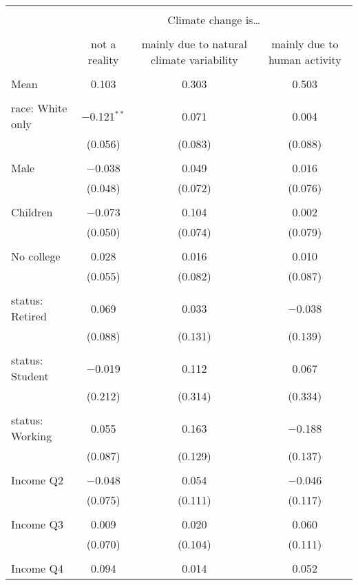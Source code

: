
\begin{tabular}{@{\extracolsep{5pt}}lccc} 
\\[-1.8ex]\hline 
\hline \\[-1.8ex] 
 & \multicolumn{3}{c}{Climate change is…} \\ 
\cline{2-4} 
\\[-1.8ex] & not a reality & mainly due to natural climate variability & mainly due to human activity \\ 
\hline \\[-1.8ex] 
 Mean & 0.103 & 0.303 & 0.503  \\ \hline \\[-1.8ex] race: White only & $-$0.121$^{**}$ & 0.071 & 0.004 \\ 
  & (0.056) & (0.083) & (0.088) \\ 
  & & & \\ 
 Male & $-$0.038 & 0.049 & 0.016 \\ 
  & (0.048) & (0.072) & (0.076) \\ 
  & & & \\ 
 Children & $-$0.073 & 0.104 & 0.002 \\ 
  & (0.050) & (0.074) & (0.079) \\ 
  & & & \\ 
 No college & 0.028 & 0.016 & 0.010 \\ 
  & (0.055) & (0.082) & (0.087) \\ 
  & & & \\ 
 status: Retired & 0.069 & 0.033 & $-$0.038 \\ 
  & (0.088) & (0.131) & (0.139) \\ 
  & & & \\ 
 status: Student & $-$0.019 & 0.112 & 0.067 \\ 
  & (0.212) & (0.314) & (0.334) \\ 
  & & & \\ 
 status: Working & 0.055 & 0.163 & $-$0.188 \\ 
  & (0.087) & (0.129) & (0.137) \\ 
  & & & \\ 
 Income Q2 & $-$0.048 & 0.054 & $-$0.046 \\ 
  & (0.075) & (0.111) & (0.117) \\ 
  & & & \\ 
 Income Q3 & 0.009 & 0.020 & 0.060 \\ 
  & (0.070) & (0.104) & (0.111) \\ 
  & & & \\ 
 Income Q4 & 0.094 & 0.014 & 0.052 \\ 

\end{tabular}
